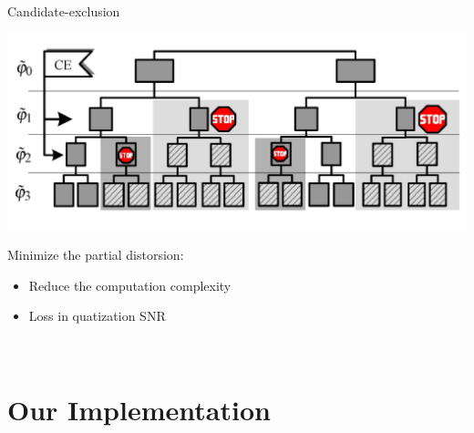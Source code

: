 \documentclass[10pt]{beamer}
\begin{document}
\begin{frame}{Candidate-exclusion}
\begin{center}
  \includegraphics[width=\linewidth]{./img/arbre.png}
\end{center}
Minimize the partial distorsion\footnotemark:
  \begin{itemize}
    \item Reduce the computation complexity
    \item Loss in quatization SNR
    \end{itemize}

    \begin{figure}
      \begin{minipage}{\textwidth}
               \\
      \end{minipage}
    \end{figure}
\end{frame}


  \begingroup
  \section{Our Implementation}
  \endgroup
\end{document}

